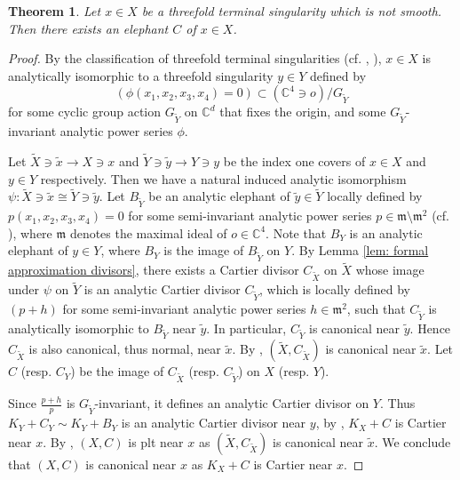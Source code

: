\documentclass[11pt]{amsart}
\numberwithin{equation}{section}
\newcommand{\Cc}{\mathbb{C}}
\newcommand{\fm}{\mathfrak{m}}
\newtheorem{thm}{Theorem}[section]
\theoremstyle{definition}
\theoremstyle{definition}
\begin{document}
\begin{thm}
Let $x\in X$ be a threefold terminal singularity which is not smooth.
Then there exists an elephant $C$ of $x\in X$.
\end{thm}
\begin{proof}
By the classification of threefold terminal singularities (cf. \cite[(6.1) Theorem]{Rei87}, \cite[Theorems 12,23,25]{Mor85}), $x\in X$ is analytically isomorphic to a threefold singularity
$y\in Y$ defined by
$$(\phi(x_1,x_2,x_3,x_4)=0)\subset (\mathbb C^4\ni o)/G_{\tilde{Y}}$$ for some cyclic group action $G_{\tilde{Y}}$ on $\Cc^d$ that fixes the origin, and some $G_{\tilde{Y}}$-invariant analytic power series $\phi$.


Let $\tilde{X}\ni \tilde{x}\to X\ni x$ and $\tilde{Y}\ni \tilde{y}\to Y\ni y$ be the index one covers of $x\in X$ and $y\in Y$ respectively. Then we have a natural induced analytic isomorphism $\psi:\tilde{X}\ni \tilde{x}\cong \tilde{Y}\ni \tilde{y}$. Let $B_{\tilde{Y}}$ be an analytic elephant of $\tilde{y}\in \tilde{Y}$ locally defined by $p(x_1,x_2,x_3,x_4)=0$ for some semi-invariant analytic power series $p\in \mathfrak{m}\setminus \mathfrak{m}^2$ (cf. \cite[(6.4)(B)]{Rei87}), where $\mathfrak{m}$ denotes the maximal ideal of $o\in \Cc^4$. Note that $B_Y$ is an analytic elephant of $y\in Y$, where $B_Y$ is the image of $B_{\tilde{Y}}$ on $Y$. By Lemma \ref{lem: formal approximation divisors}, there exists a Cartier divisor $C_{\tilde{X}}$ on $\tilde{X}$ whose image under $\psi$ on $\tilde{Y}$ is an analytic Cartier divisor $C_{\tilde{Y}}$, which is locally defined by $(p+h)$ for some semi-invariant analytic power series $h\in \fm^2$, such that $C_{\tilde{Y}}$ is analytically isomorphic to $B_{\tilde{Y}}$ near $\tilde{y}$. In particular, $C_{\tilde{Y}}$ is canonical near $\tilde{y}$. Hence $C_{\tilde{X}}$ is also canonical, thus normal, near $\tilde{x}$. By \cite[Proposition~5.46]{KM98}, $(\tilde{X},C_{\tilde{X}})$ is canonical near $\tilde{x}$. Let $C$ (resp. $C_Y$) be the image of $C_{\tilde{X}}$ (resp. $C_{\tilde{Y}}$) on $X$ (resp. $Y$).

Since $\frac{p+h}{p}$ is $G_{\tilde{Y}}$-invariant, it defines an analytic Cartier divisor on $Y$. Thus $K_Y+C_Y\sim K_Y+B_Y$ is an analytic Cartier divisor near $y$, by \cite[Lemma~5.1]{Kaw88}, $K_X+C$ is Cartier near $x$. By \cite[Proposition~5.20]{KM98}, $(X,C)$ is plt near $x$ as $(\tilde{X},C_{\tilde{X}})$ is canonical near $\tilde{x}$. We conclude that $(X,C)$ is canonical near $x$ as $K_X+C$ is Cartier near $x$. 
\end{proof}
\end{document}
